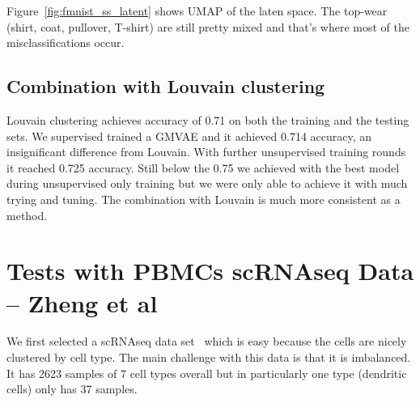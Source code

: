 \documentclass[11pt, a4paper]{report}
\theoremstyle{plain}
\theoremstyle{definition}
\theoremstyle{remark}
\begin{document}
Figure~\ref{fig:fmnist_ss_latent} shows UMAP of the laten space.
The top-wear (shirt, coat, pullover, T-shirt) are still pretty mixed and that's
where most of the misclassifications occur.


\section{Combination with Louvain clustering}

Louvain clustering achieves accuracy of 0.71 on both the training and the
testing sets.
We supervised trained a GMVAE and it achieved 0.714 accuracy, an insignificant
difference from Louvain. With further unsupervised training rounds it reached 
0.725 accuracy. Still below the 0.75 we achieved with the best model during 
unsupervised only training but we were only able to
achieve it with much trying and tuning.
The combination with Louvain is much more consistent as a method.


\chapter{Tests with PBMCs scRNAseq Data -- Zheng et al}

We first selected a scRNAseq data set~\cite{zheng2017massively} which is easy
because the cells are nicely clustered by cell type.
The main challenge with this data is that it is imbalanced. It has 2623 samples
of 7 cell types overall but in particularly one type (dendritic cells) only has 37 samples.
\end{document}
